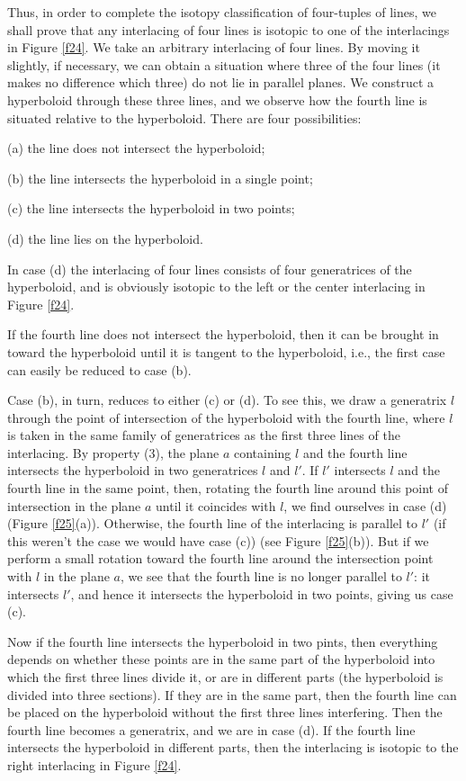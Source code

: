 \documentclass{article}
\begin{document}
Thus, in order to complete the isotopy classification of four-tuples of lines,
we shall prove that any interlacing of four lines is isotopic to one of the
interlacings in Figure \ref{f24}. We take an arbitrary interlacing of 
four lines. By
moving it slightly, if necessary, we can obtain a situation where three of the
four lines (it makes no difference which three) do not lie in parallel planes.
We construct a hyperboloid through these three lines, and we observe how the
fourth line is situated relative to the hyperboloid. There are four
possibilities:

(a) the line does not intersect the hyperboloid;

(b) the line intersects the hyperboloid in a single point;

(c) the line intersects the hyperboloid in two points;

(d) the line lies on the hyperboloid.


In case (d) the interlacing of four lines consists of four generatrices of the
hyperboloid, and is obviously isotopic to the left or the center interlacing in
Figure \ref{f24}.

If the fourth line does not intersect the hyperboloid, then it can be brought
in toward the hyperboloid until it is tangent to the hyperboloid, i.e., the
first case can easily be reduced to case (b).

Case (b), in turn, reduces to either (c) or (d). To see this, we draw a
generatrix $l$ through the point of intersection of the hyperboloid with the
fourth line, where $l$ is taken in the same family of generatrices as the first
three lines of the interlacing. By property (3), the plane $a$ containing $l$
and the fourth line intersects the hyperboloid in two generatrices $l$ and
$l'$. If $l'$ intersects $l$ and the fourth line in the same point, then,
rotating the fourth line around this point of intersection in the plane $a$
until it coincides with $l$, we find ourselves in case (d) (Figure 
\ref{f25}(a)).
Otherwise, the fourth line of the interlacing is parallel to $l'$ (if this
weren't the case we would have case (c)) (see Figure \ref{f25}(b)). 
But if we perform
a small rotation toward the fourth line around the intersection point with $l$
in the plane $a$, we see that the fourth line is no longer parallel to
$l'$: it intersects $l'$, and hence it intersects the hyperboloid in two
points, giving us case (c).

Now if the fourth line intersects the hyperboloid in two pints, then everything
depends on whether these points are in the same part of the hyperboloid into
which the first three lines divide it, or are in different parts (the
hyperboloid is divided into three sections). If they are in the same part, then
the fourth line can be placed on the hyperboloid without the first three lines
interfering. Then the fourth line becomes a generatrix, and we are in case (d).
If the fourth line intersects the hyperboloid in different parts, then the
interlacing is isotopic to the right interlacing in Figure \ref{f24}.
\end{document}
